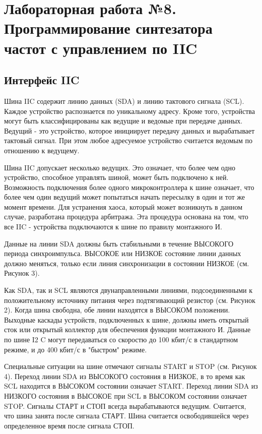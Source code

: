 \chapter{Лабораторная работа №8. Программирование синтезатора частот с управлением по IIC}

\section{Интерфейс IIC}

Шина IIC содержит линию данных (SDA) и линию тактового сигнала (SCL). 
Каждое устройство распознается по уникальному адресу.
Кроме того, устройства могут быть классифицированы как ведущие и ведомые при передаче данных.
Ведущий - это устройство, которое инициирует передачу данных и
вырабатывает тактовый сигнал. При этом любое адресуемое устройство считается
ведомым по отношению к ведущему. 

Шина IIC допускает несколько ведущих. Это означает, что более чем одно устройство, 
способное управлять шиной, может быть подключено к ней.
Возможность подключения более одного микроконтроллера к шине означает, что более
чем один ведущий может попытаться начать пересылку в один и тот же момент времени. 
Для устранения хаоса, который может возникнуть в данном случае, разработана
процедура арбитража. Эта процедура основана на том, что все IIC - устройства подключаются к шине по правилу монтажного И.

Данные на линии SDA должны быть стабильными в течение ВЫСОКОГО периода
синхроимпульса. ВЫСОКОЕ или НИЗКОЕ состояние линии данных должно меняться, 
только если линия синхронизации в состоянии НИЗКОЕ (см. Рисунок 3). 

Как SDA, так и SCL являются двунаправленными линиями, подсоединенными к
положительному источнику питания через подтягивающий резистор (см. Рисунок 2). 
Когда шина свободна, обе линии находятся в ВЫСОКОМ положении. Выходные каскады
устройств, подключенных к шине, должны иметь открытый сток или открытый коллектор
для обеспечения функции монтажного И. Данные по шине I2
C могут передаваться со скоростю до 100 кбит/с в стандартном режиме, и до 400 кбит/с в "быстром" режиме. 

Специальные ситуации на шине отмечают сигналы START и STOP (см. Рисунок 4). 
Переход линии SDA из ВЫСОКОГО состояния в НИЗКОЕ, в то время как SCL находится
в ВЫСОКОМ состоянии означает START. 
Переход линии SDA из НИЗКОГО состояния в ВЫСОКОЕ при SCL в ВЫСОКОМ
состоянии означает STOP. 
Сигналы СТАРТ и СТОП всегда вырабатываются ведущим. Считается, что шина занята
после сигнала СТАРТ. Шина считается освободившейся через определенное время после
сигнала СТОП. 

